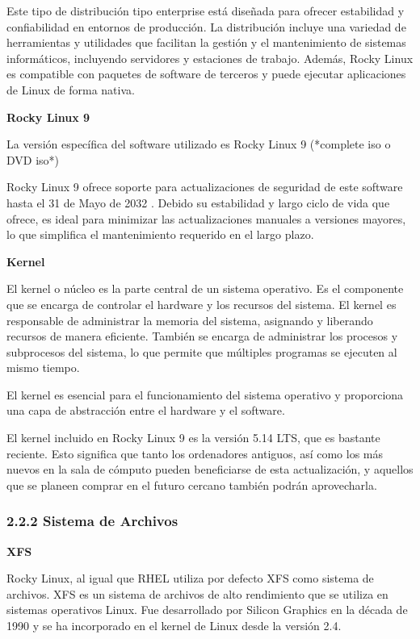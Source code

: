 \begin{spacing}{1.5}
    Este tipo de distribución tipo enterprise está diseñada para ofrecer estabilidad y confiabilidad en entornos de producción. La distribución incluye una variedad de herramientas y utilidades que facilitan la gestión y el mantenimiento de sistemas informáticos, incluyendo servidores y estaciones de trabajo. Además, Rocky Linux es compatible con paquetes de software de terceros y puede ejecutar aplicaciones de Linux de forma nativa. \cite{RL-1}

    \textbf{Rocky Linux 9}
    
    La versión específica del software utilizado es Rocky Linux 9 (*complete iso o DVD iso*) \cite{RL9-download-1} \cite{RL9-release-1}  \cite{RHEL-release-1} 

    Rocky Linux 9 ofrece soporte para actualizaciones de seguridad de este software hasta el 31 de Mayo de 2032 \cite{RL9-EOL-1}. Debido su estabilidad y largo ciclo de vida que ofrece, es ideal para minimizar las actualizaciones manuales a versiones mayores, lo que simplifica el mantenimiento requerido en el largo plazo.

    \textbf{Kernel}

    El kernel o núcleo es la parte central de un sistema operativo. Es el componente que se encarga de controlar el hardware y los recursos del sistema. El kernel es responsable de administrar la memoria del sistema, asignando y liberando recursos de manera eficiente. También se encarga de administrar los procesos y subprocesos del sistema, lo que permite que múltiples programas se ejecuten al mismo tiempo.

    El kernel es esencial para el funcionamiento del sistema operativo y proporciona una capa de abstracción entre el hardware y el software.  \cite{RHEL-kernel-1}

    El kernel incluido en Rocky Linux 9 es la versión 5.14 LTS, que es bastante reciente. Esto significa que tanto los ordenadores antiguos, así como los más nuevos en la sala de cómputo pueden beneficiarse de esta actualización, y aquellos que se planeen comprar en el futuro cercano también podrán aprovecharla. \cite{RL9-release-1}

    \subsubsection{2.2.2 Sistema de Archivos}

    \textbf{XFS}
    
    Rocky Linux, al igual que RHEL utiliza por defecto XFS como sistema de archivos. XFS es un sistema de archivos de alto rendimiento que se utiliza en sistemas operativos Linux. Fue desarrollado por Silicon Graphics en la década de 1990 y se ha incorporado en el kernel de Linux desde la versión 2.4.


\end{spacing}
